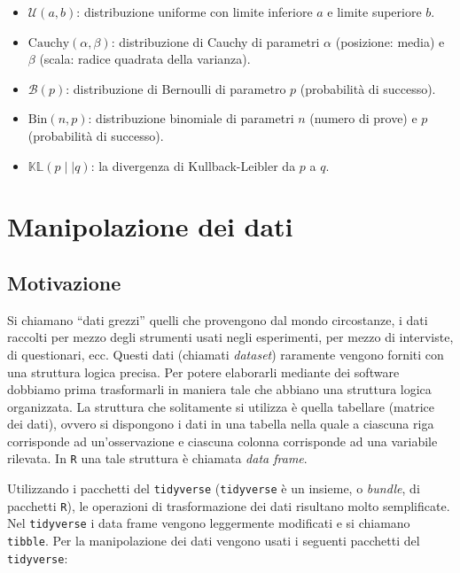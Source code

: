 \documentclass[
  10pt,
  italian,
  a4paper,
  extrafontsizes,onecolumn,openright
  ]{memoir}
\begin{document}
\begin{itemize}
\item
  \(\mathcal{U}(a, b)\): distribuzione uniforme con limite inferiore \(a\) e limite superiore \(b\).
\item
  \(\mbox{Cauchy}(\alpha, \beta)\): distribuzione di Cauchy di parametri \(\alpha\) (posizione: media) e \(\beta\) (scala: radice quadrata della varianza).
\item
  \(\mathcal{B}(p)\): distribuzione di Bernoulli di parametro \(p\) (probabilità di successo).
\item
  \(\mbox{Bin}(n, p)\): distribuzione binomiale di parametri \(n\) (numero di prove) e \(p\) (probabilità di successo).
\item
  \(\mathbb{KL} (p \mid\mid q)\): la divergenza di Kullback-Leibler da \(p\) a \(q\).
\end{itemize}

\hypertarget{manipolazione-dei-dati}{%
\section{Manipolazione dei dati}\label{manipolazione-dei-dati}}

\hypertarget{motivazione}{%
\subsection{Motivazione}\label{motivazione}}

Si chiamano ``dati grezzi'' quelli che provengono dal mondo circostanze, i
dati raccolti per mezzo degli strumenti usati negli esperimenti, per
mezzo di interviste, di questionari, ecc. Questi dati (chiamati
\emph{dataset}) raramente vengono forniti con una struttura logica precisa.
Per potere elaborarli mediante dei software dobbiamo prima trasformarli
in maniera tale che abbiano una struttura logica organizzata. La
struttura che solitamente si utilizza è quella tabellare (matrice dei
dati), ovvero si dispongono i dati in una tabella nella quale a ciascuna
riga corrisponde ad un'osservazione e ciascuna colonna corrisponde ad
una variabile rilevata. In \texttt{R} una tale struttura è chiamata \emph{data frame}.

Utilizzando i pacchetti del \texttt{tidyverse} (\texttt{tidyverse} è un insieme, o \emph{bundle}, di pacchetti \texttt{R}), le operazioni di trasformazione dei dati risultano molto semplificate. Nel \texttt{tidyverse} i data frame vengono leggermente modificati e si chiamano \texttt{tibble}. Per la manipolazione dei dati vengono usati i seguenti pacchetti del \texttt{tidyverse}:
\end{document}
